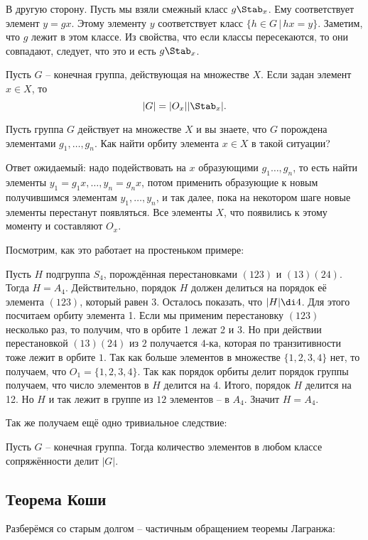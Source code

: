 В другую сторону. Пусть мы взяли смежный класс $g\Stab_x$. Ему соответствует элемент $y=gx$. Этому элементу $y$ соответствует класс $\{h\in G\,|\, hx=y\}$. Заметим, что $g$ лежит в этом классе. Из свойства, что если классы пересекаются, то они совпадают, следует, что это и есть $g\Stab_x$.
\endproof

\crl
Пусть $G$ -- конечная группа, действующая на множестве $X$. Если задан элемент $x\in X$, то $$|G|=|O_x||\Stab_x|.$$
\ecrl


Пусть группа $G$ действует на множестве $X$ и вы знаете, что $G$ порождена элементами $g_1,\dots,g_n$. Как найти орбиту элемента $x \in X$ в такой ситуации?

Ответ ожидаемый: надо подействовать на $x$ образующими $g_1\dots,g_n$, то есть найти элементы $y_1=g_1x,\dots, y_n=g_n x$, потом применить образующие к новым получившимся элементам $y_1,\dots, y_n$, и так далее, пока на некотором шаге  новые элементы перестанут появляться. Все элементы $X$, что появились к этому моменту и составляют  $O_x$.

Посмотрим, как это работает на простеньком примере:

\upr Пусть $H$ подгруппа $S_4$, порождённая перестановками $(123)$ и $(13)(24)$. Тогда $H=A_4$.
\eupr
\proof[Решение]
Действительно, порядок $H$ должен делиться на порядок её элемента $(123)$, который равен 3. Осталось показать, что $|H|\di 4$. Для этого посчитаем орбиту элемента 1. Если мы применим перестановку $(123)$ несколько раз, то получим, что в орбите 1 лежат 2 и 3. Но при действии перестановкой $(13)(24)$ из $2$ получается $4$-ка, которая по транзитивности тоже лежит в орбите $1$. Так как больше элементов в множестве $\{1,2,3,4\}$ нет, то получаем, что $O_1=\{1,2,3,4\}$. Так как порядок орбиты делит порядок группы получаем, что число элементов в $H$ делится на 4. Итого, порядок $H$ делится на 12. Но $H$ и так лежит в группе из $12$ элементов -- в $A_4$. Значит $H=A_4$.
\endproof

Так же получаем ещё одно тривиальное следствие:

\crl Пусть $G$ -- конечная группа. Тогда количество элементов в любом классе сопряжённости делит $|G|$. 
\ecrl



\subsection{Теорема Коши}

Разберёмся со старым долгом -- частичным обращением теоремы Лагранжа:

